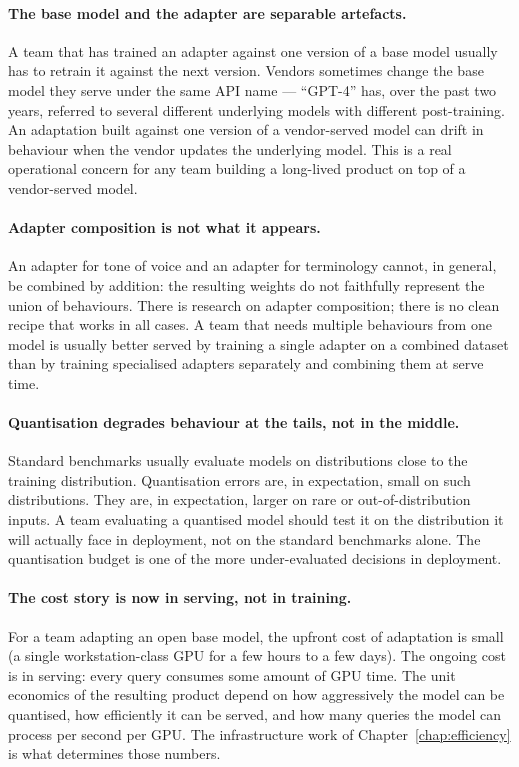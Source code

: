 \paragraph{The base model and the adapter are separable
artefacts.} A team that has trained an adapter against one
version of a base model usually has to retrain it against the
next version. Vendors sometimes change the base model they
serve under the same API name --- ``GPT-4'' has, over the past
two years, referred to several different underlying models with
different post-training. An adaptation built against one
version of a vendor-served model can drift in behaviour when
the vendor updates the underlying model. This is a real
operational concern for any team building a long-lived product
on top of a vendor-served model.

\paragraph{Adapter composition is not what it appears.} An
adapter for tone of voice and an adapter for terminology
cannot, in general, be combined by addition: the resulting
weights do not faithfully represent the union of behaviours.
There is research on adapter composition; there is no clean
recipe that works in all cases. A team that needs multiple
behaviours from one model is usually better served by training
a single adapter on a combined dataset than by training
specialised adapters separately and combining them at serve
time.

\paragraph{Quantisation degrades behaviour at the tails, not
in the middle.} Standard benchmarks usually evaluate models on
distributions close to the training distribution. Quantisation
errors are, in expectation, small on such distributions. They
are, in expectation, larger on rare or out-of-distribution
inputs. A team evaluating a quantised model should test it on
the distribution it will actually face in deployment, not on
the standard benchmarks alone. The quantisation budget is one
of the more under-evaluated decisions in deployment.

\paragraph{The cost story is now in serving, not in training.}
For a team adapting an open base model, the upfront cost of
adaptation is small (a single workstation-class GPU for a few
hours to a few days). The ongoing cost is in serving: every
query consumes some amount of GPU time. The unit economics of
the resulting product depend on how aggressively the model can
be quantised, how efficiently it can be served, and how many
queries the model can process per second per GPU. The
infrastructure work of Chapter~\ref{chap:efficiency} is what determines those
numbers.

